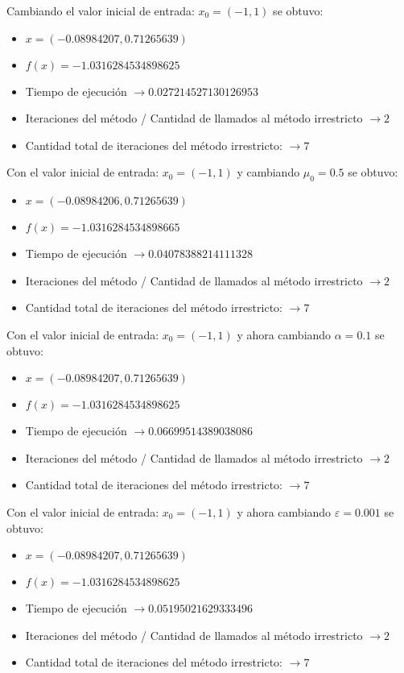 \documentclass[titlepage, 11pt]{scrartcl}
\begin{document}
	Cambiando el valor inicial de entrada: $x_0 = (-1, 1)$ se obtuvo:
	\begin{itemize}
		\item $x = (-0.08984207,  0.71265639)$
		\item $f(x) = -1.0316284534898625$
		\item Tiempo de ejecución $\rightarrow 0.027214527130126953$
		\item Iteraciones del método / Cantidad de llamados al método irrestricto $\rightarrow 2$
		\item Cantidad total de iteraciones del método irrestricto: $\rightarrow 7$
	\end{itemize}
	Con el valor inicial de entrada: $x_0 = (-1, 1)$ y cambiando $\mu_0 = 0.5$ se obtuvo:
	\begin{itemize}
		\item $x = (-0.08984206,  0.71265639)$
		\item $f(x) = -1.0316284534898665$
		\item Tiempo de ejecución $\rightarrow 0.04078388214111328$
		\item Iteraciones del método / Cantidad de llamados al método irrestricto $\rightarrow 2$
		\item Cantidad total de iteraciones del método irrestricto: $\rightarrow 7$
	\end{itemize}
	Con el valor inicial de entrada: $x_0 = (-1, 1)$ y ahora cambiando $\alpha = 0.1$ se obtuvo:
	\begin{itemize}
		\item $x = (-0.08984207,  0.71265639)$
		\item $f(x) = -1.0316284534898625$
		\item Tiempo de ejecución $\rightarrow 0.06699514389038086$
		\item Iteraciones del método / Cantidad de llamados al método irrestricto $\rightarrow 2$
		\item Cantidad total de iteraciones del método irrestricto: $\rightarrow 7$
	\end{itemize}
	Con el valor inicial de entrada: $x_0 = (-1, 1)$ y ahora cambiando $\varepsilon = 0.001$ se obtuvo:
	\begin{itemize}
		\item $x = (-0.08984207,  0.71265639)$
		\item $f(x) = -1.0316284534898625$
		\item Tiempo de ejecución $\rightarrow 0.05195021629333496$
		\item Iteraciones del método / Cantidad de llamados al método irrestricto $\rightarrow 2$
		\item Cantidad total de iteraciones del método irrestricto: $\rightarrow 7$
	\end{itemize}
	
\end{document}
